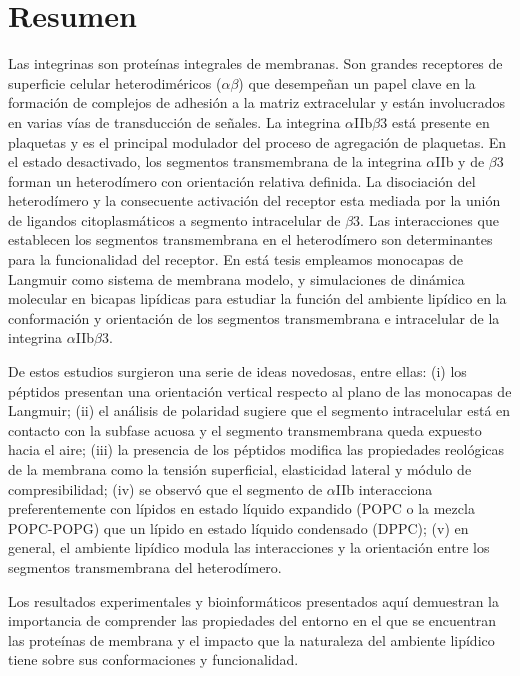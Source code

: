 \thispagestyle{empty}
\section*{Resumen}

Las integrinas son proteínas integrales de membranas. Son grandes receptores de superficie celular heterodiméricos ($\alpha$\!$\beta$) que desempeñan un papel clave en la formación de complejos de adhesión a la matriz extracelular y están involucrados en varias vías de transducción de señales. La integrina $\alpha$IIb$\beta$3 está presente en plaquetas y es el principal modulador del proceso de agregación de plaquetas. En el estado desactivado, los segmentos transmembrana de la integrina $\alpha$IIb y de $\beta$3 forman un heterodímero con orientación relativa definida. La disociación del heterodímero y la consecuente activación del receptor esta mediada por la unión de ligandos citoplasmáticos a segmento intracelular de $\beta$3. Las interacciones que establecen los segmentos transmembrana en el heterodímero son determinantes para la funcionalidad del receptor. En está tesis empleamos monocapas de Langmuir como sistema de membrana modelo, y simulaciones de dinámica molecular en bicapas lipídicas para estudiar la función del ambiente lipídico en la conformación y orientación de los segmentos transmembrana e intracelular de la integrina $\alpha$IIb$\beta$3.

De estos estudios surgieron una serie de ideas novedosas, entre ellas: (i) los péptidos presentan una orientación vertical respecto al plano de las monocapas de Langmuir; (ii) el análisis de polaridad sugiere que el segmento intracelular está en contacto con la subfase acuosa y el segmento transmembrana queda expuesto hacia el aire; (iii) la presencia de los péptidos modifica las propiedades reológicas de la membrana como la tensión superficial, elasticidad lateral y módulo de compresibilidad; (iv) se observó que el segmento de $\alpha$IIb interacciona preferentemente con lípidos en estado líquido expandido (POPC o la mezcla POPC-POPG) que un lípido en estado líquido condensado (DPPC); (v) en general, el ambiente lipídico modula las interacciones y la orientación entre los segmentos transmembrana del heterodímero. 

Los resultados experimentales y bioinformáticos presentados aquí demuestran la importancia de comprender las propiedades del entorno en el que se encuentran las proteínas de membrana y el impacto que la naturaleza del ambiente lipídico tiene sobre sus conformaciones y funcionalidad.


